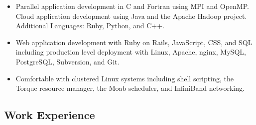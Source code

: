 \documentclass[10pt,letterpaper]{article}
\begin{document}
\begin{itemize}


	\item Parallel application development in C and Fortran using MPI and
	OpenMP. Cloud application development using Java and the Apache Hadoop
	project. Additional Languages: Ruby, Python, and C++.

	\item Web application development with Ruby on Rails, JavaScript, CSS, and
	SQL including production level deployment with Linux, Apache, nginx,
	MySQL, PostgreSQL, Subversion, and Git.

  \item Comfortable with clustered Linux systems including shell scripting, the
  Torque resource manager, the Moab scheduler, and InfiniBand networking.



\end{itemize}


\subsection*{Work Experience}
\end{document}
